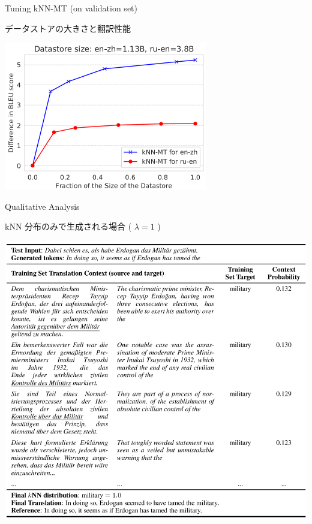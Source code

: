 \documentclass[unicode, 12pt, xdvipdfmx, aspectratio=43]{beamer}
\begin{document}
\begin{frame}[label={sec:org630e755}]{Tuning kNN-MT (on validation set)}
\begin{block}{データストアの大きさと翻訳性能}
\begin{center}
\includegraphics[width=0.5\linewidth]{./figure/Figure3.pdf}
\end{center}
\end{block}
\end{frame}

\begin{frame}[label={sec:org2b8f158}]{Qualitative Analysis}
\begin{block}{kNN 分布のみで生成される場合 ( \(\lambda = 1\) )}
\vspace{-0.5cm}
\begin{center}
\includegraphics[width=0.75\linewidth]{./figure/Figure4.pdf}
\end{center}
\end{block}
\end{frame}
\end{document}
